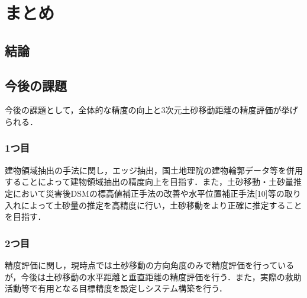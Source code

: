 \chapter{まとめ}
  \section{結論}
  \section{今後の課題}
  
    今後の課題として，全体的な精度の向上と3次元土砂移動距離の精度評価が挙げられる．

    \subsection{1つ目}
      建物領域抽出の手法に関し，エッジ抽出，国土地理院の建物輪郭データ等を併用することによって建物領域抽出の精度向上を目指す．また，土砂移動・土砂量推定において災害後DSMの標高値補正手法の改善や水平位置補正手法[10]等の取り入れによって土砂量の推定を高精度に行い，土砂移動をより正確に推定することを目指す．

    \subsection{2つ目}
      精度評価に関し，現時点では土砂移動の方向角度のみで精度評価を行っているが，今後は土砂移動の水平距離と垂直距離の精度評価を行う．また，実際の救助活動等で有用となる目標精度を設定しシステム構築を行う．
